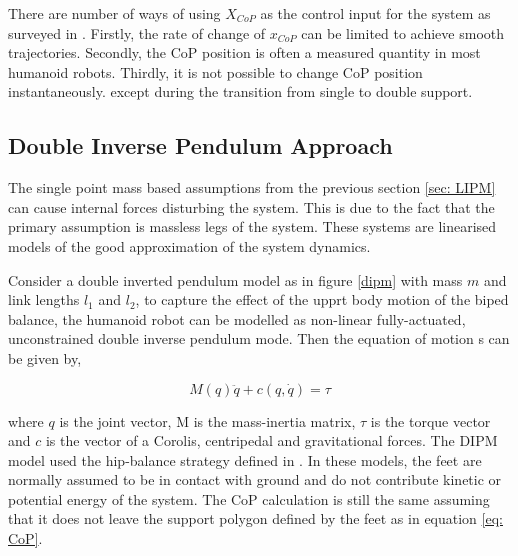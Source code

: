 There are number of ways of using $X_{CoP}$ as the control input for the system as surveyed in \cite{elhasairi2015humanoid}.
Firstly, the rate of change of $x_{CoP}$ can be limited to achieve smooth trajectories. Secondly, the CoP position is often a measured quantity in most humanoid robots. Thirdly, it is not possible to change CoP position instantaneously. except during the 
transition from single to double support. 


\subsection{Double Inverse Pendulum Approach}
\label{sec: DIPM}

The single point mass based assumptions from the previous section \ref{sec: LIPM} can cause internal forces disturbing the system. This is due to the fact that the primary assumption is massless legs of the system.
These systems are linearised models of the good approximation of the system dynamics. 

Consider a double inverted pendulum model as in figure \ref{dipm} with mass $m$ and link lengths $l_1$ and $l_2$, to capture the effect of the upprt body motion of the biped balance, the humanoid robot can be modelled as 
non-linear fully-actuated, unconstrained double inverse pendulum mode. Then the equation of motion s can be given by,

\begin{equation}
    \label{eq: DIPM}
    M(q)\ddot{q} + c(q, \dot{q}) = \tau
\end{equation}

where $q$ is the joint vector, M is the mass-inertia matrix, $\tau$ is the torque vector and $c$ is the vector of a Corolis, centripedal and gravitational forces. The DIPM model used the hip-balance strategy defined in \cite{atkeson2007multiple}. In these models, the feet are normally
assumed to be in contact with ground and do not contribute kinetic or potential energy of the system. The CoP calculation is still the same assuming that it does not leave the support polygon defined by the feet as in equation \ref{eq: CoP}.
 
